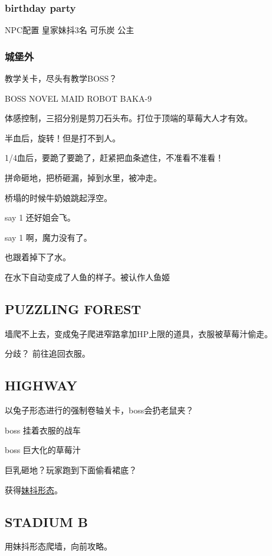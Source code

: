 \documentclass{article}
\begin{document}
\subsubsection{birthday party}

NPC配置 皇家妹抖3名 可乐炭 公主

\subsubsection{城堡外}

教学关卡，尽头有教学BOSS？

BOSS NOVEL MAID ROBOT BAKA-9

体感控制，三招分别是剪刀石头布。打位于顶端的草莓大人才有效。

半血后，旋转！但是打不到人。

1/4血后，要跪了要跪了，赶紧把血条遮住，不准看不准看！

拼命砸地，把桥砸漏，掉到水里，被冲走。

桥塌的时候牛奶娘跳起浮空。

say 1 还好姐会飞。


say 1 啊，魔力没有了。

也跟着掉下了水。

在水下自动变成了人鱼的样子。被认作人鱼姬



\subsection{PUZZLING FOREST}

墙爬不上去，变成兔子爬进窄路拿加HP上限的道具，衣服被草莓汁偷走。

分歧？ 前往追回衣服。

\subsection{HIGHWAY}

以兔子形态进行的强制卷轴关卡，boss会扔老鼠夹？

boss 挂着衣服的战车

boss 巨大化的草莓汁

巨乳砸地？玩家跑到下面偷看裙底？

获得\hyperref[costume_maid]{妹抖形态}。

\subsection{STADIUM B}

用妹抖形态爬墙，向前攻略。
\end{document}
